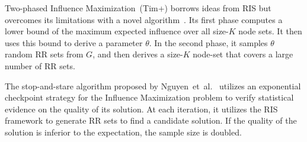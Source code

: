 

Two-phased Influence Maximization~({\sc Tim+}) borrows ideas from RIS but overcomes its limitations with a novel algorithm~\cite{tim}. Its first phase computes a lower bound of the maximum expected influence over all size-$K$ node sets. It then uses this bound to derive a parameter $\theta$. In the second phase, it samples $\theta$ random RR sets from $G$, and then derives a size-$K$ node-set that covers a large number of RR sets.

The stop-and-stare algorithm proposed by Nguyen~et~al.~\cite{nguyen2016stop} utilizes an exponential checkpoint strategy for the Influence Maximization problem to verify statistical evidence on the quality of its solution. At each iteration, it utilizes the RIS framework to generate RR sets to find a candidate solution. If the quality of the solution is inferior to the expectation, the sample size is doubled.



